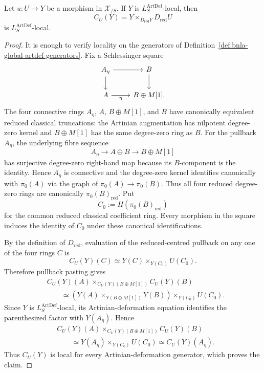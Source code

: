 \begin{lemma}
\label{lem:bnla-artdef-centred-locality}
Let $u:U\to Y$ be a morphism in $\mathcal X_{/S}$.  If $Y$ is
$L^{\mathrm{ArtDef}}_S$-local, then
\[
    C_U(Y)=Y\times_{D_{\mathrm{red}}Y}D_{\mathrm{red}}U
\]
is $L^{\mathrm{ArtDef}}_S$-local.
\end{lemma}

\begin{proof}
It is enough to verify locality on the generators of
Definition~\ref{def:bnla-global-artdef-generators}.  Fix a Schlessinger
square
\[
\begin{tikzcd}
A_\eta \arrow[r] \arrow[d] & B \arrow[d]\\
A \arrow[r,"\eta"'] & B\oplus M[1].
\end{tikzcd}
\]
The four connective rings
$A_\eta$, $A$, $B\oplus M[1]$, and $B$ have canonically equivalent reduced
classical truncations: the Artinian augmentation has nilpotent degree-zero
kernel and $B\oplus M[1]$ has the same degree-zero ring as $B$.  For the
pullback $A_\eta$, the underlying fibre sequence
\[
    A_\eta\longrightarrow A\oplus B\longrightarrow B\oplus M[1]
\]
has surjective degree-zero right-hand map because its $B$-component is the
identity.  Hence $A_\eta$ is connective and the degree-zero kernel identifies
canonically with $\pi_0(A)$ via the graph of
$\pi_0(A)\to\pi_0(B)$.  Thus all four reduced degree-zero rings are
canonically $\pi_0(B)_{\mathrm{red}}$.  Put
\[
    C_0:=H\!\left(\pi_0(B)_{\mathrm{red}}\right)
\]
for the common reduced classical coefficient ring.  Every
morphism in the square induces the identity of $C_0$ under these canonical
identifications.

By the definition of $D_{\mathrm{red}}$, evaluation of the reduced-centred
pullback on any one of the four rings $C$ is
\[
    C_U(Y)(C)
    \simeq
    Y(C)\times_{Y(C_0)}U(C_0).
\]
Therefore pullback pasting gives
\[
\begin{aligned}
&C_U(Y)(A)
\times_{C_U(Y)(B\oplus M[1])}
C_U(Y)(B)
\\
&\qquad\simeq
\left(
    Y(A)\times_{Y(B\oplus M[1])}Y(B)
\right)
\times_{Y(C_0)}U(C_0).
\end{aligned}
\]
Since $Y$ is $L^{\mathrm{ArtDef}}_S$-local, its Artinian-deformation equation
identifies the parenthesized factor with $Y(A_\eta)$.  Hence
\[
\begin{aligned}
&C_U(Y)(A)
\times_{C_U(Y)(B\oplus M[1])}
C_U(Y)(B)
\\
&\qquad\simeq
Y(A_\eta)\times_{Y(C_0)}U(C_0)
\simeq
C_U(Y)(A_\eta).
\end{aligned}
\]
Thus $C_U(Y)$ is local for every Artinian-deformation generator, which proves
the claim.
\end{proof}

